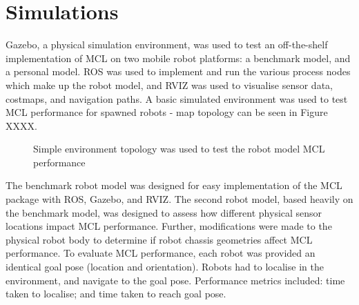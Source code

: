 \documentclass[a4paper]{article}
\begin{document}
\section{Simulations}
Gazebo, a physical simulation environment, was used to test an off-the-shelf implementation of MCL on two mobile robot platforms: a benchmark model, and a personal model. ROS was used to implement and run the various process nodes which make up the robot model, and RVIZ was used to visualise sensor data, costmaps, and navigation paths. A basic simulated environment was used to test MCL performance for spawned robots - map topology can be seen in Figure XXXX.
\begin{figure}[h]
\centering
{}
\caption{Simple environment topology was used to test the robot model MCL performance}
\end{figure}

The benchmark robot model was designed for easy implementation of the MCL package with ROS, Gazebo, and RVIZ. The second robot model, based heavily on the benchmark model, was designed to assess how different physical sensor locations impact MCL performance. Further, modifications were made to the physical robot body to determine if robot chassis geometries affect MCL performance. To evaluate MCL performance, each robot was provided an identical goal pose (location and orientation). Robots had to localise in the environment, and navigate to the goal pose. Performance metrics included: time taken to localise; and time taken to reach goal pose.
\end{document}
